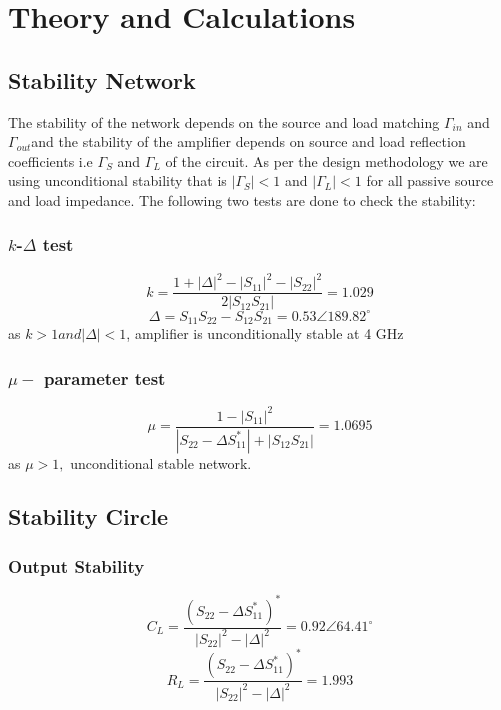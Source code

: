 \chapter{Theory and Calculations} \label{Theory and Calculations}

\section{ Stability Network } \label{ Stability Network }
\noindent The stability of the network depends on the source and load matching $\Gamma_{in}$ and $\Gamma_{out} $and the stability of the amplifier depends on source and load reflection coefficients i.e $\Gamma_{\textit{S}}$ and $\Gamma_{L}$ of the circuit. As per the design methodology we are using unconditional stability that is $|\Gamma_{S}| < 1$ and $|\Gamma_{L}| < 1$ for all passive source and load impedance. The following two tests are done to check the stability:

\subsection{ \boldmath $k$-$\Delta$ test}
\begin{equation}
k = \frac{1 + {| \Delta | }^{2} - {|S_{11}|}^{2} -  {|S_{22}|}^{2}}{2|S_{12}S_{21}|} = 1.029
\end{equation}
\begin{equation}
\Delta = S_{11}S_{22} - S_{12}S_{21} = 0.53 \angle {189.82}^{\circ}
\end{equation}
\noindent as $k > 1 and |\Delta| < 1$, amplifier is unconditionally stable at 4 GHz

\subsection{ \boldmath $\mu -$ parameter test}
\begin{equation}
\mu = \frac{1 - {|S_{11}|}^{2}}{|S_{22} - \Delta S^{*}_{11}| + |S_{12}S_{21}|}   = 1.0695
\end{equation}
\noindent as $\mu > 1,$ unconditional stable network.

\section{ Stability Circle } \label{ Stability Circle }
\subsection{Output Stability}
\begin{equation}
C_{L} = \frac{(S_{22} - \Delta S^{*}_{11})^{*}}{{|S_{22}|}^{2} - {|\Delta|}^{2}} = 0.92 \angle {64.41}^{\circ}
\end{equation}
\begin{equation}
R_{L} = \frac{(S_{22} - \Delta S^{*}_{11})^{*}}{{|S_{22}|}^{2} - {|\Delta|}^{2}} = 1.993 
\end{equation}

